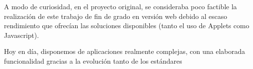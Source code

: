 A modo de curiosidad, en el proyecto original, se consideraba poco factible la realización de 
este trabajo de fin de grado en versión web debido al escaso rendimiento que ofrecían las 
soluciones disponibles (tanto el uso de Applets como Javascript).

\bigskip
Hoy en día, disponemos de aplicaciones realmente complejas, con una elaborada funcionalidad 
gracias a la evolución tanto de los estándares 